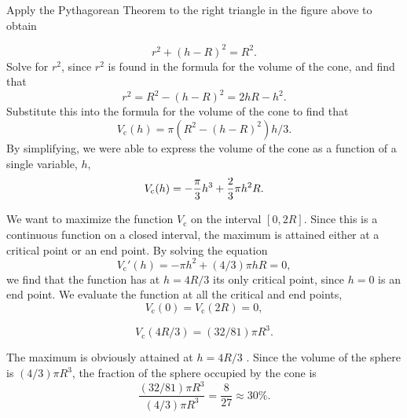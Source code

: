 \documentclass{ximera}
\begin{document}
\begin{example}
\begin{explanation}
\begin{image}
\end{image}

Apply the Pythagorean Theorem to the right triangle in the figure above to obtain

\[
r^2 + (h-R)^2=R^2.
\] 
Solve for $r^2$, since $r^2$ is found in the formula for the volume
of the cone, and find that
\[
r^2=R^2-(h-R)^2=2hR-h^2.
\]  
Substitute this into the formula for the volume of the cone to find that 
\[
 V_{\text{c}}(h)=\pi(R^2-(h-R)^2)h/3. 
 \]
By simplifying, we were able to express the volume of the cone as a function of a single variable, $h$,
\[
 V_{\text{c}}(h)=-{\pi\over3}h^3+{2\over3}\pi h^2R.
 \]

We want to maximize the function $V_{\text{c}}$ on the interval $[0,2R]$.
Since this is a continuous function on a closed interval, the maximum is attained either at a critical point or an end point.
By solving the equation 
\[
V_{\text{c}}'(h)=-\pi h^2+(4/3)\pi h R=0,
\] 
we find that the function has at $h=4R/3$ its only critical point, since $h=0$ is an end point.  We evaluate the function at all the critical and end points,
\[
V_{\text{c}}(0)=V_{\text{c}}(2R)=0,
\]

\[
V_{\text{c}}(4R/3)=(32/81)\pi R^3.
\] 

The maximum is obviously attained at $h=4R/3$ . Since the volume of the sphere is $(4/3)\pi
R^3$, the fraction of the sphere occupied by the cone is
\[
\frac{(32/81)\pi R^3}{(4/3)\pi R^3}=\frac{8}{27}\approx 30\%.
\]
\end{explanation}
\end{example}
\end{document}
